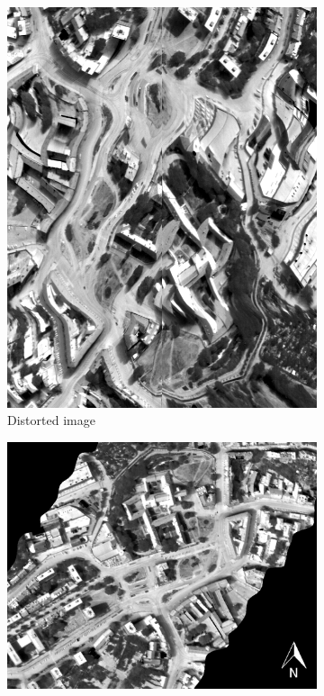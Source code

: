 \begin{figure}[thb]
	\centering
	\vspace{1em}
	\begin{subfigure}[t]{.38\linewidth}
		\centering
		\includegraphics[scale=0.24]{pics/Chapter_02/TASIcalibrated.png}
		\caption{Distorted image}
		\label{fig:ResponseFunctions}
	\end{subfigure}
	\hspace{2em}
	\begin{subfigure}[t]{.52\linewidth}
		\centering
		\includegraphics[scale=1]{pics/Chapter_02/TASIgeoreferencedcut.png}

\end{subfigure}
\end{figure}
